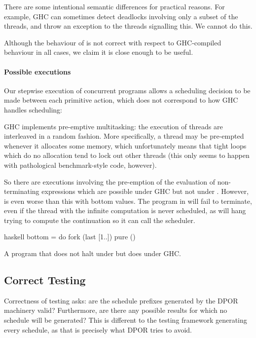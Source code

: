 There are some intentional semantic differences for practical reasons.
For example, GHC can sometimes detect deadlocks involving only a
subset of the threads, and throw an exception to the threads
signalling this.  We cannot do this.

Although the behaviour of \dejafu{} is not correct with respect to
GHC-compiled behaviour in all cases, we claim it is close enough to be
useful.

\paragraph{Possible executions}
Our stepwise execution of concurrent programs allows a scheduling
decision to be made between each primitive action, which does not
correspond to how GHC handles scheduling:

\begin{displayquote}
  GHC implements pre-emptive multitasking: the execution of threads
  are interleaved in a random fashion.  More specifically, a thread may
  be pre-empted whenever it allocates some memory, which unfortunately
  means that tight loops which do no allocation tend to lock out other
  threads (this only seems to happen with pathological benchmark-style
  code, however). \parencite{control_concurrent}
\end{displayquote}

So there are executions involving the pre-emption of the evaluation of
non-terminating expressions which are possible under GHC but not under
\dejafu{}.  However, \dejafu{} is even worse than this with bottom
values.  The program in  will fail to terminate, even
if the thread with the infinite computation is never scheduled, as
\dejafu{} will hang trying to compute the continuation so it can call
the scheduler.

\begin{listing}
\centering
\begin{cminted}{haskell}
bottom = do
  fork (last [1..])
  pure ()
\end{cminted}
\caption{A program that does not halt under \dejafu{} but does under GHC.}\label{lst:bottom}
\end{listing}

\subsection{Correct Testing}

Correctness of testing asks: are the schedule prefixes generated by
the DPOR machinery valid?  Furthermore, are there any possible results
for which no schedule will be generated?  This is different to the
testing framework generating every schedule, as that is precisely what
DPOR tries to avoid.

